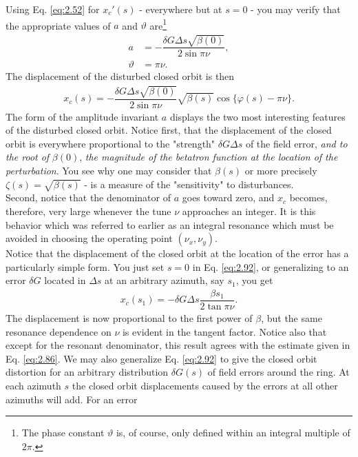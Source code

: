 Using Eq. \eqref{eq:2.52} for $x_c'(s)$ - everywhere but at $s = 0$ - you may verify that the
appropriate values of $a$ and $\vartheta$ are\footnote{The phase constant $\vartheta$ is, of course, only defined within an integral multiple of $2\pi$.}
\begin{align}
	a &= -\dfrac{\delta G \Delta s \sqrt{\beta(0)}}{2 \sin \pi \nu},\\
    \vartheta &= \pi\nu.
\end{align}
The displacement of the disturbed closed orbit is then
\begin{align}\label{eq:2.92}
	x_c(s) = -\dfrac{\delta G \Delta s \sqrt{\beta(0)}}{2 \sin\pi\nu}\sqrt{\beta(s)}\cos\{\varphi(s)-\pi\nu\}.
\end{align}
The form of the amplitude invariant $a$ displays the two most interesting features of the disturbed closed orbit. Notice first, that the displacement of the closed orbit is everywhere
 proportional to the "strength" $\delta G \Delta s$ of the field error, \emph{and to the root of} $\beta(0)$, \emph{the magnitude of the betatron function at the location of the perturbation}. You see why one may consider that $\beta(s)$ or more precisely $\zeta(s) = \sqrt{\beta(s)}$ - is a measure of the "sensitivity" to disturbances.\\
Second, notice that the denominator of $a$ goes toward zero, and $x_c$ becomes, therefore, very large whenever the tune $\nu$ approaches an integer. It is this behavior which was referred
 to earlier as an integral resonance which must be avoided in choosing the operating point $(\nu_x, \nu_y)$.\\
Notice that the displacement of the closed orbit at the location of the error has a particularly
 simple form. You just set $s = 0$ in Eq. \eqref{eq:2.92}, or generalizing to an error $\delta G$ located in $\Delta s$ at an arbitrary azimuth, say $s_1$, you get
 \begin{align}
	x_c(s_1) = -\delta G \Delta s \dfrac{\beta{s_1}}{2 \tan\pi\nu}.
\end{align}
The displacement is now proportional to the first power of $\beta$, but the same resonance
dependence on $\nu$ is evident in the tangent factor. Notice also that except for the resonant denominator, this result agrees with the estimate given in Eq. \eqref{eq:2.86}.
We may also generalize Eq. \eqref{eq:2.92} to give the closed orbit distortion for an
arbitrary distribution $\delta G(s)$ of field errors around the ring. At each azimuth $s$ the closed orbit displacements caused by the errors at all other azimuths will add. For an error
